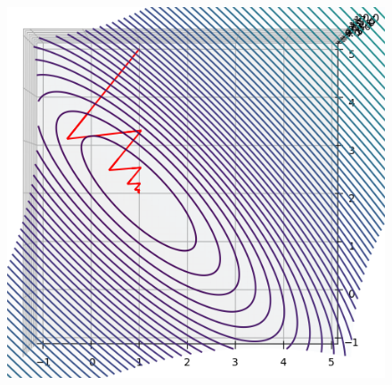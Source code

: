 \documentclass{article}
\begin{document}
\begin{figure} 
    \includegraphics[width=\textwidth]{exempel.png}
  \end{figure}
\newpage  
\end{document}
